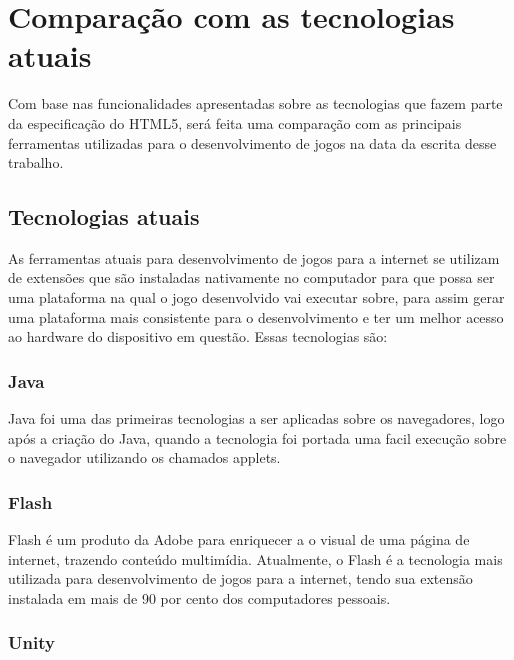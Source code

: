 \section{Comparação com as tecnologias atuais}

Com base nas funcionalidades apresentadas sobre as tecnologias que
fazem parte da especificação do HTML5, será feita uma comparação com
as principais ferramentas utilizadas para o desenvolvimento de jogos
na data da escrita desse trabalho.

\subsection{Tecnologias atuais}

As ferramentas atuais para desenvolvimento de jogos para a internet se
utilizam de extensões que são instaladas nativamente no computador
para que possa ser uma plataforma na qual o jogo desenvolvido vai
executar sobre, para assim gerar uma plataforma mais consistente para
o desenvolvimento e ter um melhor acesso ao hardware do dispositivo em
questão. Essas tecnologias são:

\subsubsection{Java}

Java foi uma das primeiras tecnologias a ser aplicadas sobre os
navegadores, logo após a criação do Java, quando a tecnologia foi
portada uma facil execução sobre o navegador utilizando os chamados
applets.

\subsubsection{Flash}

Flash é um produto da Adobe para enriquecer a o visual de uma página
de internet, trazendo conteúdo multimídia. Atualmente, o Flash é a
tecnologia mais utilizada para desenvolvimento de jogos para a
internet, tendo sua extensão instalada em mais de 90 por cento dos
computadores pessoais.


\subsubsection{Unity}

